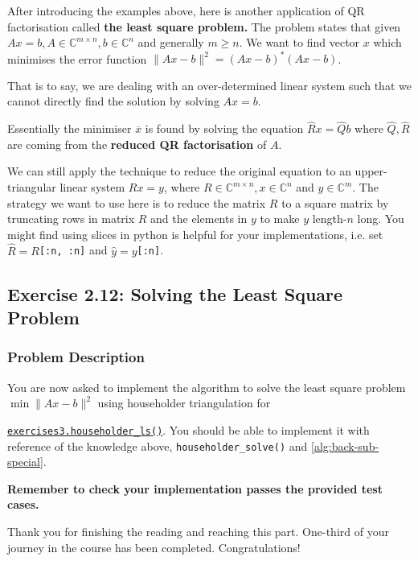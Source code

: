 \noindent After introducing the examples above, here is another application of QR factorisation called \textbf{the least square problem.} The problem states that given \(Ax = b, A \in \mathbb{C}^{m \times n}, b \in \mathbb{C}^{n}\) and generally \(m \geq n\). We want to find vector \(x\) which minimises the error function \(\|Ax - b\|^2 = (Ax - b)^{*}(Ax - b)\). \medskip

\noindent That is to say, we are dealing with an over-determined linear system such that we cannot directly find the solution by solving \(Ax = b\). \medskip

\noindent Essentially the minimiser $\overline{x}$ is found by solving the equation $\hat{R}x = \hat{Q}b$ where \(\hat{Q}, \hat{R}\) are coming from the \textbf{reduced QR factorisation} of \(A\). \medskip

\noindent We can still apply the technique to reduce the original equation to an upper-triangular linear system $Rx = y$, where $R \in \mathbb{C}^{m\times n}, x \in \mathbb{C}^{n}$ and $y \in \mathbb{C}^{m}$. The strategy we want to use here is to reduce the matrix $R$ to a square matrix by truncating rows in matrix \(R\)  and the elements in \(y\)  to make \(y\)   length-\(n\) long. You might find using slices in python is helpful for your implementations, i.e. set \(\hat{R} = R\)\texttt{[:n, :n]} and \(\hat{y} = y\)\texttt{[:n]}.


\subsection*{Exercise 2.12: Solving the Least Square Problem}
\subsubsection*{Problem Description}%
You are now asked to implement the algorithm to solve the least square problem $\min \|Ax - b\|^2$
using householder triangulation for 

\noindent \href{https://comp-lin-alg.github.io/cla_utils.html#cla_utils.exercises3.householder_ls}{\texttt{exercises3.householder\_ls()}}. You should be able to implement it with reference of the knowledge above, \texttt{householder\_solve()} and \autoref{alg:back-sub-special}. \medskip

\noindent \textbf{Remember to check your implementation passes the provided test cases.} \newpage

\noindent Thank you for finishing the reading and reaching this part. One-third of your journey in the course has been completed. Congratulations! \medskip

